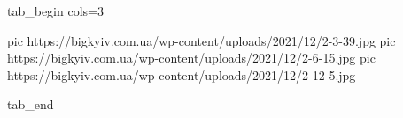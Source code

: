  
 
 
 
 

\ifcmt
  tab_begin cols=3

     pic https://bigkyiv.com.ua/wp-content/uploads/2021/12/2-3-39.jpg
     pic https://bigkyiv.com.ua/wp-content/uploads/2021/12/2-6-15.jpg
		 pic https://bigkyiv.com.ua/wp-content/uploads/2021/12/2-12-5.jpg

  tab_end
\fi
